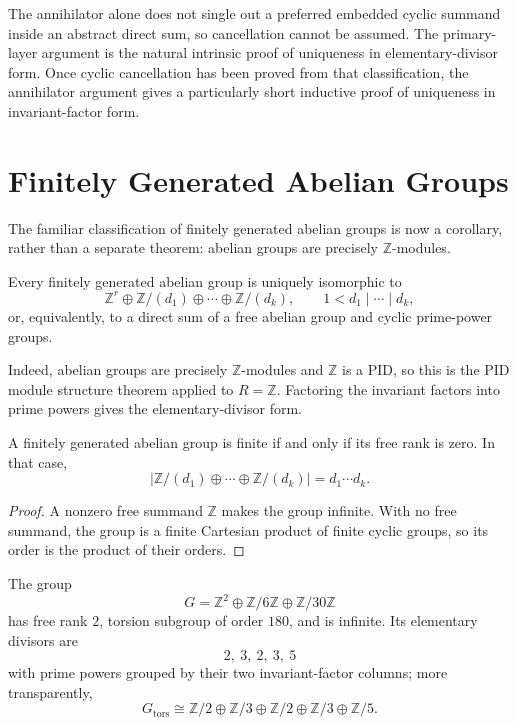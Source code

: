 \begin{remark}
The annihilator alone does not single out a preferred embedded cyclic summand
inside an abstract direct sum, so cancellation cannot be assumed. The
primary-layer argument is the natural intrinsic proof of uniqueness in
elementary-divisor form. Once cyclic cancellation has been proved from that
classification, the annihilator argument gives a particularly short inductive
proof of uniqueness in invariant-factor form.
\end{remark}

\section{Finitely Generated Abelian Groups}
The familiar classification of finitely generated abelian groups is now a
corollary, rather than a separate theorem: abelian groups are precisely
\(\mathbb Z\)-modules.

\begin{corollary}
Every finitely generated abelian group is uniquely isomorphic to
\[
\mathbb Z^r\oplus\mathbb Z/(d_1)\oplus\cdots\oplus\mathbb Z/(d_k),
\qquad 1<d_1\mid\cdots\mid d_k,
\]
or, equivalently, to a direct sum of a free abelian group and cyclic
prime-power groups.
\end{corollary}

Indeed, abelian groups are precisely \(\mathbb Z\)-modules and
\(\mathbb Z\) is a PID, so this is the PID module structure theorem applied
to \(R=\mathbb Z\).  Factoring the invariant factors into prime powers gives
the elementary-divisor form.

\begin{corollary}
A finitely generated abelian group is finite if and only if its free rank is
zero.  In that case,
\[
\left|\mathbb Z/(d_1)\oplus\cdots\oplus\mathbb Z/(d_k)\right|
=d_1\cdots d_k.
\]
\end{corollary}
\begin{proof}
A nonzero free summand \(\mathbb Z\) makes the group infinite.  With no free
summand, the group is a finite Cartesian product of finite cyclic groups, so
its order is the product of their orders.
\end{proof}

\begin{example}
The group
\[
G=\mathbb Z^2\oplus\mathbb Z/6\mathbb Z\oplus\mathbb Z/30\mathbb Z
\]
has free rank \(2\), torsion subgroup of order \(180\), and is infinite.
Its elementary divisors are
\[
2,\ 3,\ 2,\ 3,\ 5
\]
with prime powers grouped by their two invariant-factor columns; more
transparently,
\[
G_{\mathrm{tors}}\cong
\mathbb Z/2\oplus\mathbb Z/3\oplus
\mathbb Z/2\oplus\mathbb Z/3\oplus\mathbb Z/5.
\]
\end{example}


